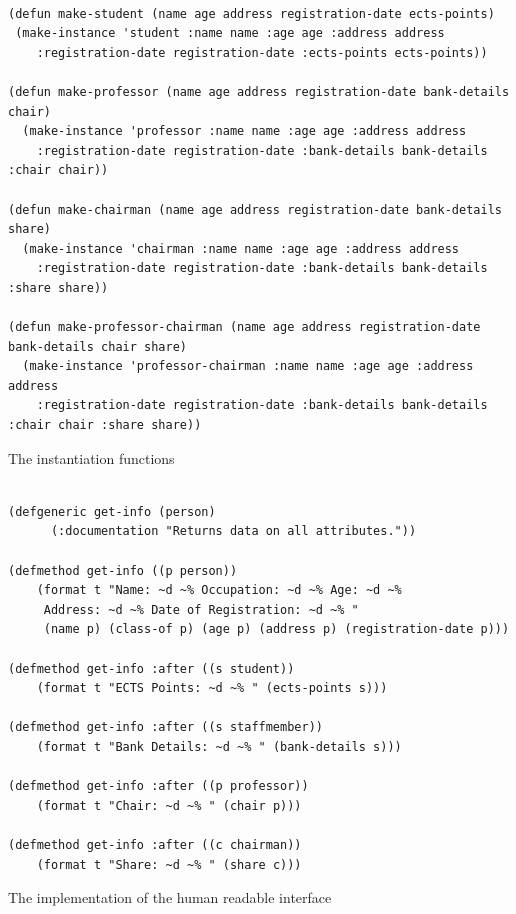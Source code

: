 \documentclass[oribibl]{llncs}
\begin{document}
\begin{listing}[]%
\begin{verbatim}

(defun make-student (name age address registration-date ects-points)
 (make-instance 'student :name name :age age :address address
    :registration-date registration-date :ects-points ects-points))

(defun make-professor (name age address registration-date bank-details chair)
  (make-instance 'professor :name name :age age :address address
    :registration-date registration-date :bank-details bank-details :chair chair))

(defun make-chairman (name age address registration-date bank-details share)
  (make-instance 'chairman :name name :age age :address address
    :registration-date registration-date :bank-details bank-details :share share))

(defun make-professor-chairman (name age address registration-date bank-details chair share)
  (make-instance 'professor-chairman :name name :age age :address address
    :registration-date registration-date :bank-details bank-details :chair chair :share share))
\end{verbatim}
\caption{The instantiation functions}
\label{lst:insts}
\end{listing}



\begin{listing}[]%
\begin{verbatim}

(defgeneric get-info (person)
      (:documentation "Returns data on all attributes."))

(defmethod get-info ((p person))
    (format t "Name: ~d ~% Occupation: ~d ~% Age: ~d ~% 
     Address: ~d ~% Date of Registration: ~d ~% "
     (name p) (class-of p) (age p) (address p) (registration-date p)))

(defmethod get-info :after ((s student))
    (format t "ECTS Points: ~d ~% " (ects-points s)))

(defmethod get-info :after ((s staffmember))
    (format t "Bank Details: ~d ~% " (bank-details s)))

(defmethod get-info :after ((p professor))
    (format t "Chair: ~d ~% " (chair p)))

(defmethod get-info :after ((c chairman))
    (format t "Share: ~d ~% " (share c)))

\end{verbatim}
\caption{The implementation of the human readable interface}
\label{lst:implementation}
\end{listing}
\end{document}
